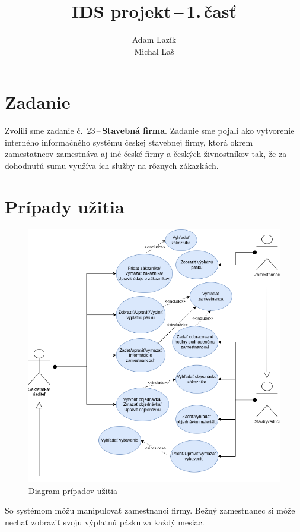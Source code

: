 \documentclass[a4paper]{article}
\title{IDS projekt\,--\,1.\,časť}
\author{Adam Lazík\\
Michal Ľaš}
\begin{document}
\maketitle

\section{Zadanie}

Zvolili sme zadanie č.~23\,--\,\textbf{Stavebná firma}.
Zadanie sme pojali ako vytvorenie interného informačného systému českej stavebnej firmy, ktorá okrem zamestatncov zamestnáva aj iné české firmy a českých živnostníkov tak, že za dohodnutú sumu využíva ich služby na rôznych zákazkách.

\section{Prípady užitia}

\begin{figure}[H]
    \centering
    \includegraphics[width=\linewidth,height=0.55\textheight,keepaspectratio]{StavebnaFirmaUseCase.png}
    \caption{Diagram prípadov užitia}
\end{figure}

So systémom môžu manipulovať zamestnanci firmy.
Bežný zamestnanec si môže nechať zobraziť svoju výplatnú pásku za každý mesiac.
\end{document}
